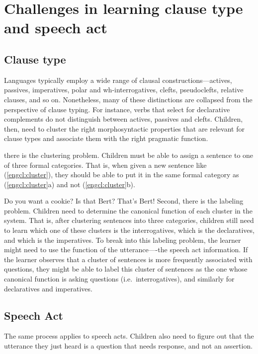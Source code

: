 \section{Challenges in learning clause type and speech act}
\label{sec:intro:challenges}
\subsection{Clause type}
Languages typically employ a wide range of clausal constructions—actives, passives, imperatives, polar and wh-interrogatives, clefts, pseudoclefts, relative clauses, and so on. Nonetheless, many of these distinctions are collapsed from the perspective of clause typing. For instance, verbs that select for declarative complements do not distinguish between actives, passives and clefts. Children, then, need to cluster the right morphosyntactic properties that are relevant for clause types and associate them with the right pragmatic function.


there is the clustering problem. Children must be able to assign a sentence to one of three formal categories. That is, when given a new sentence like (\ref{engcl:cluster}), they should be able to put it in the same formal category as (\ref{engcl:cluster}a) and not (\ref{engcl:cluster}b). 

Do you want a cookie?
\bxl{}
Is that Bert?
\ex
That’s Bert!
\exl
\eex
Second, there is the labeling problem. Children need to determine the canonical function of each cluster in the system. That is, after clustering sentences into three categories, children still need to learn which one of these clusters is the interrogatives, which is the declaratives, and which is the imperatives. To break into this labeling problem, the learner might need to use the function of the utterance—-the speech act information. If the learner observes that a cluster of sentences is more frequently associated with questions, they might be able to label this cluster of sentences as the one whose canonical function is asking questions (i.e.\ interrogatives), and similarly for declaratives and imperatives. 

\subsection{Speech Act}
The same process applies to speech acts. Children also need to figure out that the utterance they just heard is a question that needs response, and not an assertion. 


